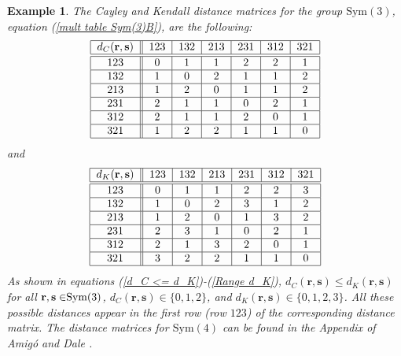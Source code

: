 \documentclass[%
 aip,
 amsmath,amssymb,
 reprint,%
]{revtex4-1}
\newtheorem{example}[theorem]{Example}
\begin{document}
\begin{example}
\label{ExampleSym(3)}The Cayley and Kendall distance matrices for the group $%
\mathrm{Sym}(3)$, equation (\ref{mult table Sym(3)B}), are the following: 
\begin{equation}
\begin{tabular}{|c||c|c|c|c|c|c|}
\hline
$d_{C}(\mathbf{r},\mathbf{s})$ & $123$ & $132$ & $213$ & $231$ & $312$ & $%
321 $ \\ \hline\hline
$123$ & $0$ & $1$ & $1$ & $2$ & $2$ & $1$ \\ \hline
$132$ & $1$ & $0$ & $2$ & $1$ & $1$ & $2$ \\ \hline
$213$ & $1$ & $2$ & $0$ & $1$ & $1$ & $2$ \\ \hline
$231$ & $2$ & $1$ & $1$ & $0$ & $2$ & $1$ \\ \hline
$312$ & $2$ & $1$ & $1$ & $2$ & $0$ & $1$ \\ \hline
$321$ & $1$ & $2$ & $2$ & $1$ & $1$ & $0$ \\ \hline
\end{tabular}
\label{d_C(Sym(3))}
\end{equation}%
and 
\begin{equation}
\begin{tabular}{|c||c|c|c|c|c|c|}
\hline
$d_{K}(\mathbf{r},\mathbf{s})$ & $123$ & $132$ & $213$ & $231$ & $312$ & $%
321 $ \\ \hline\hline
$123$ & $0$ & $1$ & $1$ & $2$ & $2$ & $3$ \\ \hline
$132$ & $1$ & $0$ & $2$ & $3$ & $1$ & $2$ \\ \hline
$213$ & $1$ & $2$ & $0$ & $1$ & $3$ & $2$ \\ \hline
$231$ & $2$ & $3$ & $1$ & $0$ & $2$ & $1$ \\ \hline
$312$ & $2$ & $1$ & $3$ & $2$ & $0$ & $1$ \\ \hline
$321$ & $3$ & $2$ & $2$ & $1$ & $1$ & $0$ \\ \hline
\end{tabular}
\label{d_K(Sym(3))}
\end{equation}%
As shown in equations (\ref{d_C <= d_K})-(\ref{Range d_K}), $d_{C}(\mathbf{r}%
,\mathbf{s})\leq d_{K}(\mathbf{r},\mathbf{s})$ for all $\mathbf{r},\mathbf{%
s\in }\mathrm{Sym}(3)$, $d_{C}(\mathbf{r},\mathbf{s})\in \{0,1,2\}$, and $%
d_{K}(\mathbf{r},\mathbf{s})\in \{0,1,2,3\}$. All these possible distances
appear in the first row (row $123$) of the corresponding distance matrix.
The distance matrices for $\mathrm{Sym}(4)$ can be found in the Appendix of
Amig\'{o} and Dale \cite{Amigo2025}.
\end{example}
\end{document}
